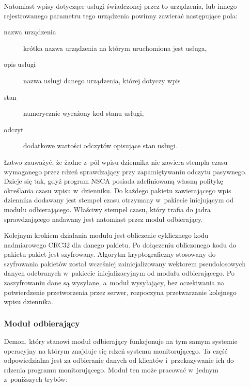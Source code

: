 Natomiast wpisy dotyczące usługi świadczonej przez to urządzenia, lub
innego rejestrowanego parametru tego urządzenia powinny zawierać
następujące pola:

\begin{description}
\item[nazwa urządzenia] krótka nazwa urządzenia na którym uruchomiona
  jest usługa,
\item[opis usługi] nazwa usługi danego urządzenia, której dotyczy wpis
\item[stan] numerycznie wyrażony kod stanu usługi,
\item[odczyt] dodatkowe wartości odczytów opisujące stan usługi.
\end{description}

Łatwo zauważyć, że żadne z~pól wpisu dziennika nie zawiera stempla
czasu wymaganego przez rdzeń sprawdzający przy zapamiętywaniu odczytu
pasywnego. Dzieje się tak, gdyż program NSCA posiada zdefiniowaną
własną politykę określania czasu wpisu w~dzienniku. Do każdego pakietu
zawierającego wpis dziennika dodawany jest stempel czasu otrzymany
w~pakiecie inicjującym od modułu odbierającego. Właściwy stempel
czasu, który trafia do jadra sprawdzającego nadawany jest natomiast
przez moduł odbierający.

Kolejnym krokiem działania modułu jest obliczenie cyklicznego kodu
nadmiarowego CRC32 dla danego pakietu. Po dołączeniu obliczonego kodu
do pakietu pakiet jest szyfrowany. Algorytm kryptograficzny stosowany do
szyfrowania pakietów został wcześniej zainicjalizowany wektorem
pseudolosowych danych odebranych w~pakiecie inicjalizacyjnym od modułu
odbierającego. Po zaszyfrowaniu dane są wysyłane, a~moduł wysyłający,
bez oczekiwania na potwierdzenie przetworzenia przez serwer,
rozpoczyna przetwarzanie kolejnego wpisu dziennika.

\subsubsection[Moduł odbierający][Moduł odbierający]{Moduł odbierający}

Demon, który stanowi moduł odbierający funkcjonuje na tym samym
systemie operacyjny na którym znajduje się rdzeń systemu
monitorującego. Ta część odpowiedzialna jest za odbieranie danych od
klientów i~przekazywanie ich do rdzenia programu monitorującego. Moduł
ten może pracować w~jednym z~poniższych trybów:

